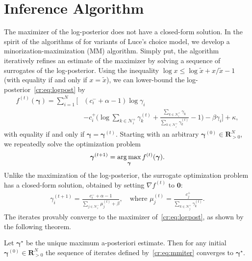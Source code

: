 \section{Inference Algorithm}  %
\label{cr:sec:algorithm}

The maximizer of the log-posterior does not have a closed-form solution.
In the spirit of the algorithms of \citet{hunter2004mm} for variants of Luce's choice model, we develop a minorization-maximization (MM) algorithm.
Simply put, the algorithm iteratively refines an estimate of the maximizer by solving a sequence of surrogates of the log-posterior.
Using the inequality $\log x \le \log \tilde{x} + x/\tilde{x} - 1$ (with equality if and only if $x = \tilde{x}$), we can lower-bound the log-posterior~\eqref{cr:eq:logpost} by
\begin{align*}
f^{(t)}(\bm{\gamma}) =
    \sum_{i = 1}^N \bigg[& (c^-_i + \alpha - 1) \log \gamma_i \\
                         &- c^+_i \bigg( \log\!\sum_{k \in \mathcal{N}^+_i}\!\gamma^{(t)}_k
                                       +\frac{\sum_{k \in \mathcal{N}^+_i}\!\gamma_k}{\sum_{k \in \mathcal{N}^+_i}\!\gamma^{(t)}_k} -1 \bigg)
                         - \beta \gamma_i \bigg] + \kappa,
\end{align*}
with equality if and only if $\bm{\gamma} = \bm{\gamma}^{(t)}$.
Starting with an arbitrary $\bm{\gamma}^{(0)} \in \mathbf{R}^N_{>0}$, we repeatedly solve the optimization problem
\begin{align*}
\bm{\gamma}^{(t+1)} = \operatorname*{arg\,max}_{\bm{\gamma}} f^{(t)}(\bm{\gamma}).
\end{align*}
Unlike the maximization of the log-posterior, the surrogate optimization problem has a closed-form solution, obtained by setting $\nabla f^{(t)}$ to $\bm{0}$:
\begin{align}
\label{cr:eq:mmiter}
\gamma_i^{(t + 1)} = \frac{c^-_i + \alpha - 1}{\sum_{j \in \mathcal{N}^-_i} \mu_j^{(t)} + \beta},
    \quad \text{where }
    \mu_j^{(t)} = \frac{c^+_j}{\sum_{k \in \mathcal{N}^+_j} \gamma_k^{(t)}}.
\end{align}
The iterates provably converge to the maximizer of~\eqref{cr:eq:logpost}, as shown by the following theorem.

\begin{theorem}
\label{cr:thm:mmconv}
Let $\bm{\gamma}^\star$ be the unique maximum a-posteriori estimate.
Then for any initial $\bm{\gamma}^{(0)} \in \mathbf{R}^N_{> 0}$ the sequence of iterates defined by~\eqref{cr:eq:mmiter} converges to $\bm{\gamma}^\star$.
\end{theorem}

